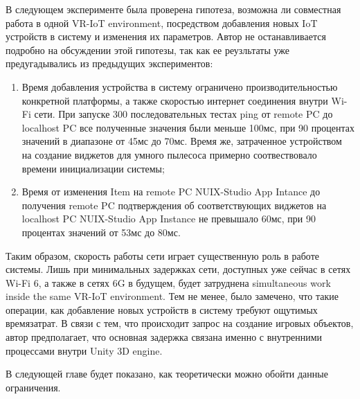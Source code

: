 В следующем эксперименте была проверена гипотеза, возможна ли совместная работа в одной VR-IoT environment, посредством добавления новых IoT устройств в систему и изменения их параметров. Автор не останавливается подробно на обсуждении этой гипотезы, так как ее реузльтаты уже предугадывались из предыдущих экспериментов:
\begin{enumerate}
    \item Время добавления устройства в систему ограничено производительностью конкретной платформы, а также скоростью интернет соединения внутри Wi-Fi сети. При запуске 300 последовательных тестах ping от remote PC до localhost PC все полученные значения были меньше 100мс, при 90 процентах значений в диапазоне от 45мс до 70мс. Время же, затраченное устройством на создание виджетов для умного пылесоса примерно соотвествовало времени инициализации системы;
    \item Время от изменения Item на remote PC NUIX-Studio App Intance до получения remote PC подтверждения об соответствующих виджетов на localhost PC NUIX-Studio App Instance не превышало 60мс, при 90 процентах значений от 53мс до 80мс.
\end{enumerate}

Таким образом, скорость работы сети играет существенную роль в работе системы. Лишь при минимальных задержках сети, доступных уже сейчас в сетях Wi-Fi 6, а также в сетях 6G в будущем, будет затруднена simultaneous work inside the same VR-IoT environment. Тем не менее, было замечено, что такие операции, как добавление новых устройств в систему требуют ощутимых времязатрат. В связи с тем, что происходит запрос на создание игровых объектов, автор предполагает, что основная задержка связана именно с внутренними процессами внутри Unity 3D engine.

В следующей главе будет показано, как теоретически можно обойти данные ограничения.